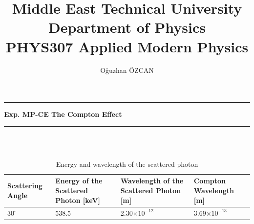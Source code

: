 \documentclass[a4paper,12pt]{article}
\title{Middle East Technical University\\Department of Physics\\\textbf{PHYS307 Applied Modern Physics}}
\author{Oğuzhan ÖZCAN\\}
\date{}
\providecommand{\expname}[1]{\textbf{Exp. MP-CE The Compton Effect} }
\begin{document}
\maketitle

\thispagestyle{fancy}

\noindent\rule{18.4cm}{0.8pt}
\begin{center}
	\expname{arg1}{}
\end{center}


\noindent\rule{18.4cm}{0.8pt}\\\\
\begin{table}[h!]
\begin{center}
	\begin{tabular}{|p{3cm}|p{3cm}|p{3cm}|p{3cm}|}
	\hline Scattering Angle & Energy of the Scattered Photon [keV] & Wavelength of the Scattered Photon [m] & Compton Wavelength [m] \\ 
	\hline 30$^{\circ}$ & 538.5 & 2.30$\times10^{-12}$ & 3.69$\times10^{-13}$ \\ 
	\hline 
\end{tabular}
\caption{Energy and wavelength of the scattered photon} 
\end{center}
\end{table}
\end{document}
